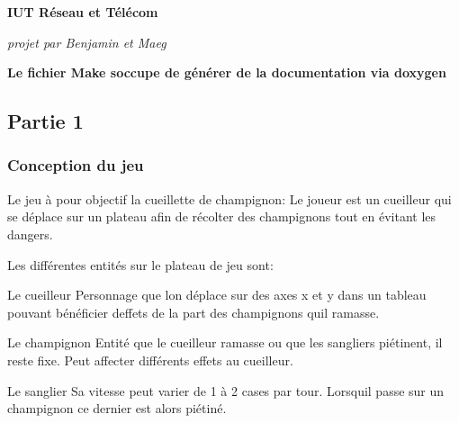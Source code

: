 {\bfseries I\+UT Réseau et Télécom}

{\itshape projet par Benjamin et Maeg} 



{\bfseries Le fichier Make s\textquotesingle{}occupe de générer de la documentation via doxygen}

\subsection*{Partie 1}

\subsubsection*{Conception du jeu}

Le jeu à pour objectif la cueillette de champignon\+: Le joueur est un cueilleur qui se déplace sur un plateau afin de récolter des champignons tout en évitant les dangers.

Les différentes entités sur le plateau de jeu sont\+:
\begin{DoxyItemize}
\item Le cueilleur Personnage que l\textquotesingle{}on déplace sur des axes x et y dans un tableau pouvant bénéficier d\textquotesingle{}effets de la part des champignons qu\textquotesingle{}il ramasse.
\item Le champignon Entité que le cueilleur ramasse ou que les sangliers piétinent, il reste fixe. Peut affecter différents effets au cueilleur.
\item Le sanglier Sa vitesse peut varier de 1 à 2 cases par tour. Lorsqu\textquotesingle{}il passe sur un champignon ce dernier est alors piétiné. 
\end{DoxyItemize}